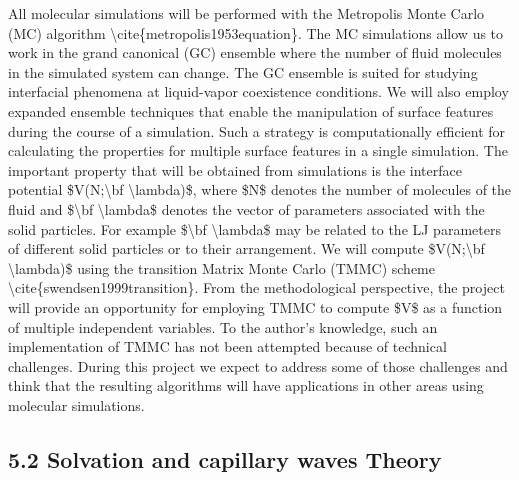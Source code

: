 \par All molecular simulations will be performed with the Metropolis Monte Carlo (MC) algorithm \textbackslash cite\{metropolis1953equation\}. The MC simulations allow us to work in the grand canonical (GC) ensemble where the number of fluid molecules in the simulated system can change. The GC ensemble is suited for studying interfacial phenomena at liquid-vapor coexistence conditions. We will also employ expanded ensemble techniques that  enable the manipulation of surface features during the course of a simulation. Such a strategy is computationally efficient for calculating the properties for multiple surface features in a single simulation. The important property that will be obtained from simulations is the interface potential \$V(N;\textbackslash bf \textbackslash lambda)\$, where \$N\$ denotes the number of molecules of the fluid and \$\textbackslash bf \textbackslash lambda\$ denotes the vector of parameters associated with the solid particles. For example \$\textbackslash bf \textbackslash lambda\$ may be related to the LJ parameters of different solid particles or to their arrangement. We will compute \$V(N;\textbackslash bf \textbackslash lambda)\$ using the transition Matrix Monte Carlo (TMMC) scheme \textbackslash cite\{swendsen1999transition\}. From the methodological perspective, the project will provide an opportunity for employing TMMC to compute \$V\$ as a function of multiple independent variables. To the author's knowledge, such an implementation of TMMC has not been attempted because of technical challenges. During this project we expect to address some of those challenges and think that the resulting algorithms will have applications in other areas using molecular simulations.\subsection{5.2 Solvation and capillary waves Theory}


